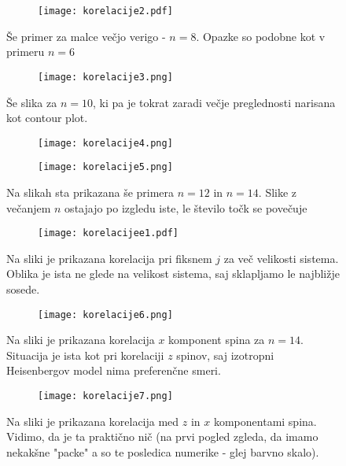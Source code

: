 \documentclass{article}
\begin{document}
\begin{figure}[H]
\centering
\begin{subfigure}{.8\textwidth}
\texttt{[image: korelacije2.pdf]}
\end{subfigure}
\caption*{Še primer za malce večjo verigo - $n=8$. Opazke so podobne kot v primeru $n=6$}
\end{figure}

\begin{figure}[H]
\centering
\begin{subfigure}{.8\textwidth}
\texttt{[image: korelacije3.png]}
\end{subfigure}
\caption*{Še slika za $n=10$, ki pa je tokrat zaradi večje preglednosti narisana kot contour plot.}
\end{figure}

\begin{figure}[H]
\centering
\begin{subfigure}{.49\textwidth}
\texttt{[image: korelacije4.png]}
\end{subfigure}
\begin{subfigure}{.49\textwidth}
\texttt{[image: korelacije5.png]}
\end{subfigure}
\caption*{Na slikah sta prikazana še primera $n=12$ in $n=14$. Slike z večanjem $n$ ostajajo po izgledu iste, le število točk se povečuje}
\end{figure}

\begin{figure}[H]
\centering
\begin{subfigure}{.8\textwidth}
\texttt{[image: korelacijee1.pdf]}
\end{subfigure}
\caption*{Na sliki je prikazana korelacija pri fiksnem $j$ za več velikosti sistema. Oblika je ista ne glede na velikost sistema, saj sklapljamo le najbližje sosede. }
\end{figure}

\begin{figure}[H]
\centering
\begin{subfigure}{.8\textwidth}
\texttt{[image: korelacije6.png]}
\end{subfigure}
\caption*{Na sliki je prikazana korelacija $x$ komponent spina za $n=14$. Situacija je ista kot pri korelaciji $z$ spinov, saj izotropni Heisenbergov model nima preferenčne smeri.}
\end{figure}

\begin{figure}[H]
\centering
\begin{subfigure}{.8\textwidth}
\texttt{[image: korelacije7.png]}
\end{subfigure}
\caption*{Na sliki je prikazana korelacija med $z$ in $x$ komponentami spina. Vidimo, da je ta praktično nič (na prvi pogled zgleda, da imamo nekakšne "packe" a so te posledica numerike - glej barvno skalo).}
\end{figure}
\end{document}

